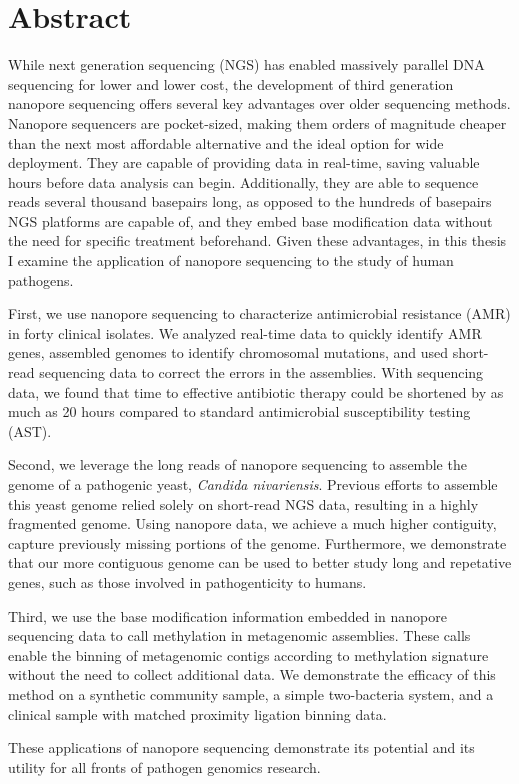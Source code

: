 \chapter*{Abstract}
\label{chap:abstract}

While next generation sequencing (NGS) has enabled massively parallel DNA sequencing for lower and lower cost, the development of third generation nanopore sequencing offers several key advantages over older sequencing methods. Nanopore sequencers are pocket-sized, making them orders of magnitude cheaper than the next most affordable alternative and the ideal option for wide deployment. They are capable of providing data in real-time, saving valuable hours before data analysis can begin. Additionally, they are able to sequence reads several thousand basepairs long, as opposed to the hundreds of basepairs NGS platforms are capable of, and they embed base modification data without the need for specific treatment beforehand. Given these advantages, in this thesis I examine the application of nanopore sequencing to the study of human pathogens.

First, we use nanopore sequencing to characterize antimicrobial resistance (AMR) in forty clinical isolates. We analyzed real-time data to quickly identify AMR genes, assembled genomes to identify chromosomal mutations, and used short-read sequencing data to correct the errors in the assemblies. With sequencing data, we found that time to effective antibiotic therapy could be shortened by as much as 20 hours compared to standard antimicrobial susceptibility testing (AST).

Second, we leverage the long reads of nanopore sequencing to assemble the genome of a pathogenic yeast, \textit{Candida nivariensis}. Previous efforts to assemble this yeast genome relied solely on short-read NGS data, resulting in a highly fragmented genome. Using nanopore data, we achieve a much higher contiguity, capture previously missing portions of the genome. Furthermore, we demonstrate that our more contiguous genome can be used to better study long and repetative genes, such as those involved in pathogenticity to humans.

Third, we use the base modification information embedded in nanopore sequencing data to call methylation in metagenomic assemblies. These calls enable the binning of metagenomic contigs according to methylation signature without the need to collect additional data. We demonstrate the efficacy of this method on a synthetic community sample, a simple two-bacteria system, and a clinical sample with matched proximity ligation binning data.

These applications of nanopore sequencing demonstrate its potential and its utility for all fronts of pathogen genomics research.
